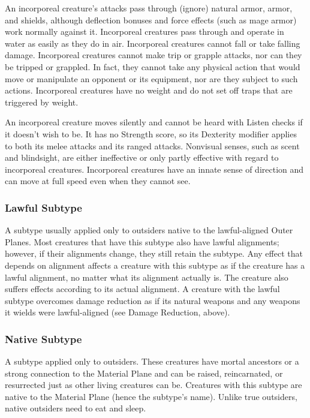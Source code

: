 An incorporeal creature's attacks pass through (ignore) natural armor, armor, and shields, although deflection bonuses and force effects (such as mage armor) work normally against it. Incorporeal creatures pass through and operate in water as easily as they do in air. Incorporeal creatures cannot fall or take falling damage. Incorporeal creatures cannot make trip or grapple attacks, nor can they be tripped or grappled. In fact, they cannot take any physical action that would move or manipulate an opponent or its equipment, nor are they subject to such actions. Incorporeal creatures have no weight and do not set off traps that are triggered by weight.

An incorporeal creature moves silently and cannot be heard with Listen checks if it doesn't wish to be. It has no Strength score, so its Dexterity modifier applies to both its melee attacks and its ranged attacks. Nonvisual senses, such as scent and blindsight, are either ineffective or only partly effective with regard to incorporeal creatures. Incorporeal creatures have an innate sense of direction and can move at full speed even when they cannot see.

\subsubsection{Lawful Subtype}
A subtype usually applied only to outsiders native to the lawful-aligned Outer Planes. Most creatures that have this subtype also have lawful alignments; however, if their alignments change, they still retain the subtype. Any effect that depends on alignment affects a creature with this subtype as if the creature has a lawful alignment, no matter what its alignment actually is. The creature also suffers effects according to its actual alignment. A creature with the lawful subtype overcomes damage reduction as if its natural weapons and any weapons it wields were lawful-aligned (see Damage Reduction, above).

\subsubsection{Native Subtype}
A subtype applied only to outsiders. These creatures have mortal ancestors or a strong connection to the Material Plane and can be raised, reincarnated, or resurrected just as other living creatures can be. Creatures with this subtype are native to the Material Plane (hence the subtype's name). Unlike true outsiders, native outsiders need to eat and sleep.

